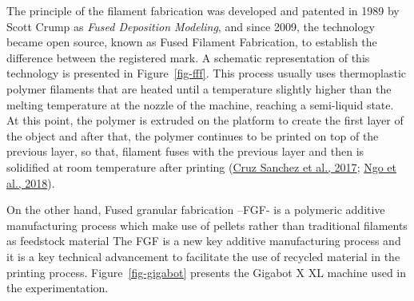 \documentclass[
  11pt,
]{article}
\begin{document}
The principle of the filament fabrication was developed and patented in
1989 by Scott Crump as \emph{Fused Deposition Modeling}, and since 2009,
the technology became open source, known as Fused Filament Fabrication,
to establish the difference between the registered mark. A schematic
representation of this technology is presented in Figure~\ref{fig-fff}.
This process usually uses thermoplastic polymer filaments that are
heated until a temperature slightly higher than the melting temperature
at the nozzle of the machine, reaching a semi-liquid state. At this
point, the polymer is extruded on the platform to create the first layer
of the object and after that, the polymer continues to be printed on top
of the previous layer, so that, filament fuses with the previous layer
and then is solidified at room temperature after printing
(\protect\hyperlink{ref-CruzSanchez2017}{Cruz Sanchez et al., 2017};
\protect\hyperlink{ref-Ngo2018}{Ngo et al., 2018}).

On the other hand, Fused granular fabrication --FGF- is a polymeric
additive manufacturing process which make use of pellets rather than
traditional filaments as feedstock material The FGF is a new key
additive manufacturing process and it is a key technical advancement to
facilitate the use of recycled material in the printing process.
Figure~\ref{fig-gigabot} presents the Gigabot X XL machine used in the
experimentation.
\end{document}

